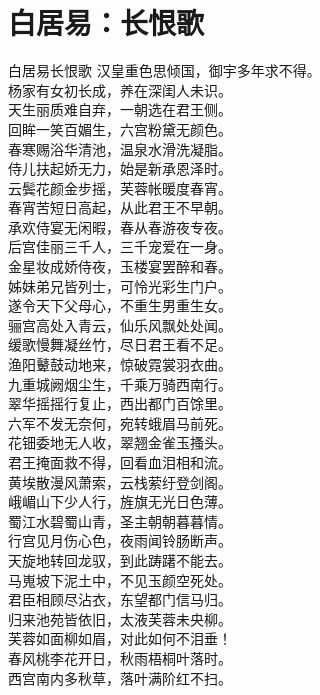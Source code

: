 \documentclass[12pt,oneside,a5paper]{book}
\begin{document}
\chapter{白居易：长恨歌}
\begin{poemzh}{白居易}{长恨歌}
汉皇重色思倾国，御宇多年求不得。\\
杨家有女初长成，养在深闺人未识。\\
天生丽质难自弃，一朝选在君王侧。\\
回眸一笑百媚生，六宫粉黛无颜色。\\
春寒赐浴华清池，温泉水滑洗凝脂。\\
侍儿扶起娇无力，始是新承恩泽时。\\
云鬓花颜金步摇，芙蓉帐暖度春宵。\\
春宵苦短日高起，从此君王不早朝。\\
承欢侍宴无闲暇，春从春游夜专夜。\\
后宫佳丽三千人，三千宠爱在一身。\\
金星妆成娇侍夜，玉楼宴罢醉和春。\\
姊妹弟兄皆列士，可怜光彩生门户。\\
遂令天下父母心，不重生男重生女。\\
骊宫高处入青云，仙乐风飘处处闻。\\
缓歌慢舞凝丝竹，尽日君王看不足。\\
渔阳鼙鼓动地来，惊破霓裳羽衣曲。\\
九重城阙烟尘生，千乘万骑西南行。\\
翠华摇摇行复止，西出都门百馀里。\\
六军不发无奈何，宛转蛾眉马前死。\\
花钿委地无人收，翠翘金雀玉搔头。\\
君王掩面救不得，回看血泪相和流。\\
黄埃散漫风萧索，云栈萦纡登剑阁。\\
峨嵋山下少人行，旌旗无光日色薄。\\
蜀江水碧蜀山青，圣主朝朝暮暮情。\\
行宫见月伤心色，夜雨闻铃肠断声。\\
天旋地转回龙驭，到此踌躇不能去。\\
马嵬坡下泥土中，不见玉颜空死处。\\
君臣相顾尽沾衣，东望都门信马归。\\
归来池苑皆依旧，太液芙蓉未央柳。\\
芙蓉如面柳如眉，对此如何不泪垂！\\
春风桃李花开日，秋雨梧桐叶落时。\\
西宫南内多秋草，落叶满阶红不扫。\\

\end{poemzh}
\end{document}
